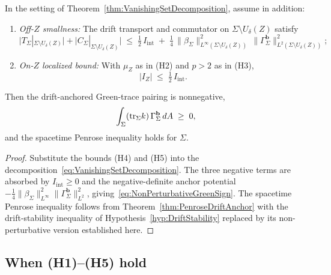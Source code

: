 \begin{theorem}\label{thm:NonPerturbativeDriftStability}
In the setting of Theorem~\ref{thm:VanishingSetDecomposition}, assume in addition:
\begin{enumerate}
    \item[\textup{(H4)}] \emph{Off-$Z$ smallness:} The drift transport and commutator on $\Sigma\setminus U_\delta(Z)$ satisfy
    \begin{equation}\label{eq:OffZSmallness}
        \bigl|T_\Sigma|_{\Sigma\setminus U_\delta(Z)}\bigr|
        +\bigl|C_\Sigma|_{\Sigma\setminus U_\delta(Z)}\bigr|
        \;\le\;
        \tfrac12\,I_{\mathrm{int}}\;+\;\tfrac14\,\|\beta_\Sigma\|_{L^\infty(\Sigma\setminus U_\delta(Z))}^2\,\|\Gamma_\Sigma^{\mathbf b}\|_{L^2(\Sigma\setminus U_\delta(Z))}^2;
    \end{equation}
    \item[\textup{(H5)}] \emph{On-$Z$ localized bound:} With $\mu_Z$ as in (H2) and $p>2$ as in (H3),
    \begin{equation}\label{eq:OnZBound}
        |I_Z|\;\le\;\tfrac12\,I_{\mathrm{int}}.
    \end{equation}
\end{enumerate}
Then the drift-anchored Green-trace pairing is nonnegative,
\begin{equation}\label{eq:NonPerturbativeGreenSign}
    \int_\Sigma(\mathrm{tr}_\Sigma k)\,\Gamma_\Sigma^{\mathbf b}\,dA\;\ge\;0,
\end{equation}
and the spacetime Penrose inequality holds for $\Sigma$.
\end{theorem}

\begin{proof}
Substitute the bounds (H4) and (H5) into the decomposition~\eqref{eq:VanishingSetDecomposition}. The three negative terms are absorbed by $I_{\mathrm{int}}\ge0$ and the negative-definite anchor potential $-\tfrac14\|\beta_\Sigma\|_{L^\infty}^2\|\Gamma_\Sigma^{\mathbf b}\|_{L^2}^2$, giving~\eqref{eq:NonPerturbativeGreenSign}. The spacetime Penrose inequality follows from Theorem~\ref{thm:PenroseDriftAnchor} with the drift-stability inequality of Hypothesis~\ref{hyp:DriftStability} replaced by its non-perturbative version established here.
\end{proof}

\subsection{When (H1)--(H5) hold}

